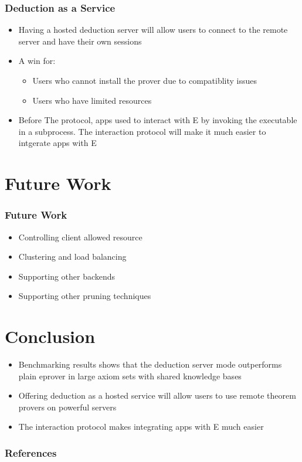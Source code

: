 \documentclass[10pt]{beamer}
\begin{document}
\begin{frame}[fragile]
  \frametitle{Deduction as a Service}
  \begin{itemize}[<+- | alert@+>]
    \item Having a hosted deduction server will allow users to connect to the remote server and have their own sessions
    \item A win for:
      \begin{itemize}
          \item Users who cannot install the prover due to compatiblity issues
          \item Users who have limited resources
      \end{itemize}
    \item Before The protocol, apps used to interact with E by invoking the executable in a subprocess. The interaction protocol will make it much easier to intgerate apps with E
  \end{itemize}

\end{frame}

\section{Future Work}
\begin{frame}[fragile]
  \frametitle{Future Work}
  \begin{itemize}[<+- | alert@+>]
    \item Controlling client allowed resource
    \item Clustering and load balancing
    \item Supporting other backends
    \item Supporting other pruning techniques
  \end{itemize}
\end{frame}

\section{Conclusion}
\begin{frame}[fragile]
  \begin{itemize}[<+- | alert@+>]
    \item Benchmarking results shows that the deduction server mode outperforms plain eprover in large axiom sets with shared knowledge bases
    \item Offering deduction as a hosted service will allow users to use remote theorem provers on powerful servers
    \item The interaction protocol makes integrating apps with E much easier
  \end{itemize}
\end{frame}


\begin{frame}[allowframebreaks]

  \frametitle{References}

  
  

\end{frame}
\end{document}

